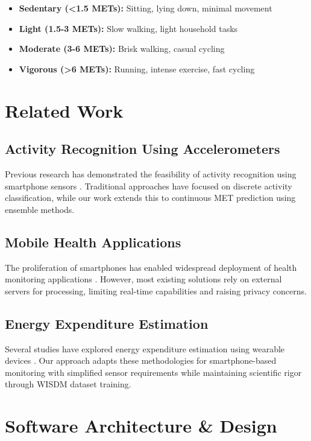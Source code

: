 \documentclass[11pt,a4paper]{article}
\begin{document}
\begin{itemize}
    \item \textbf{Sedentary (<1.5 METs):} Sitting, lying down, minimal movement
    \item \textbf{Light (1.5-3 METs):} Slow walking, light household tasks
    \item \textbf{Moderate (3-6 METs):} Brisk walking, casual cycling
    \item \textbf{Vigorous (>6 METs):} Running, intense exercise, fast cycling
\end{itemize}

\section{Related Work}

\subsection{Activity Recognition Using Accelerometers}

Previous research has demonstrated the feasibility of activity recognition using smartphone sensors \cite{kwapisz2011activity, ronao2016human}. Traditional approaches have focused on discrete activity classification, while our work extends this to continuous MET prediction using ensemble methods.

\subsection{Mobile Health Applications}

The proliferation of smartphones has enabled widespread deployment of health monitoring applications \cite{fawcett2020physical}. However, most existing solutions rely on external servers for processing, limiting real-time capabilities and raising privacy concerns.

\subsection{Energy Expenditure Estimation}

Several studies have explored energy expenditure estimation using wearable devices \cite{ellis2014hip, crouter2013refined}. Our approach adapts these methodologies for smartphone-based monitoring with simplified sensor requirements while maintaining scientific rigor through WISDM dataset training.

\section{Software Architecture \& Design}
\end{document}
